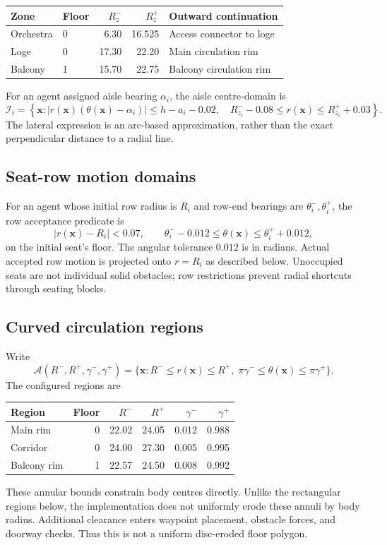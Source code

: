 \documentclass[11pt]{article}
\begin{document}
\begin{center}
\begin{tabular}{llrrl}
\toprule
Zone & Floor & $R_z^-$ & $R_z^+$ & Outward continuation\\
\midrule
Orchestra & 0 & 6.30 & 16.525 & Access connector to loge\\
Loge      & 0 & 17.30 & 22.20 & Main circulation rim\\
Balcony   & 1 & 15.70 & 22.75 & Balcony circulation rim\\
\bottomrule
\end{tabular}
\end{center}

For an agent assigned aisle bearing $\alpha_i$, the aisle centre-domain is
\[
 \mathcal I_i=\left\{\mathbf x:
 |r(\mathbf x)(\theta(\mathbf x)-\alpha_i)|
       \leq h-a_i-0.02,\quad
 R_{z_i}^- -0.08\leq r(\mathbf x)\leq R_{z_i}^++0.03\right\}.
\]
The lateral expression is an arc-based approximation, rather than the exact
perpendicular distance to a radial line.

\subsection{Seat-row motion domains}

For an agent whose initial row radius is $R_i$ and row-end bearings are
$\theta_i^-,\theta_i^+$, the row acceptance predicate is
\[
 |r(\mathbf x)-R_i|<0.07,\qquad
 \theta_i^- -0.012\leq\theta(\mathbf x)\leq\theta_i^++0.012,
\]
on the initial seat's floor. The angular tolerance $0.012$ is in radians.
Actual accepted row motion is projected onto $r=R_i$ as described below.
Unoccupied seats are not individual solid obstacles; row restrictions prevent
radial shortcuts through seating blocks.

\subsection{Curved circulation regions}

Write
\[
 \mathcal A(R^-,R^+,\gamma^-,\gamma^+)
 =\{\mathbf x:R^-\leq r(\mathbf x)\leq R^+,\;
                     \pi\gamma^-\leq\theta(\mathbf x)\leq\pi\gamma^+\}.
\]
The configured regions are
\begin{center}
\begin{tabular}{lrrrrr}
\toprule
Region & Floor & $R^-$ & $R^+$ & $\gamma^-$ & $\gamma^+$\\
\midrule
Main rim    & 0 & 22.02 & 24.05 & 0.012 & 0.988\\
Corridor    & 0 & 24.00 & 27.30 & 0.005 & 0.995\\
Balcony rim & 1 & 22.57 & 24.50 & 0.008 & 0.992\\
\bottomrule
\end{tabular}
\end{center}
These annular bounds constrain body centres directly. Unlike the rectangular
regions below, the implementation does not uniformly erode these annuli by
body radius. Additional clearance enters waypoint placement, obstacle forces,
and doorway checks. Thus this is not a uniform disc-eroded floor polygon.
\end{document}
